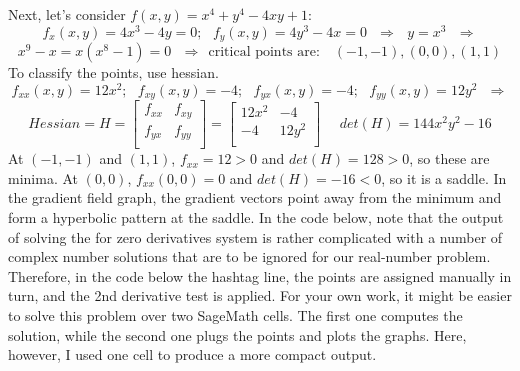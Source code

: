 Next, let's consider $f(x,y) = x^4+y^4-4xy+1$:
$$f_x(x,y) = 4x^3-4y= 0;  \ \ \ f_y(x,y) = 4y^3-4x=0 \ \ \ \Rightarrow \ \ \ y=x^3  \ \ \ \Rightarrow$$
$$ x^9-x=x(x^8-1)=0 \ \ \ \Rightarrow \ \ \text{critical points are: } \ \ \ ( -1,-1), (0,0), (1,1)$$
To classify the points, use hessian.
$$f_{xx}(x,y) =12x^2;  \ \ \ f_{xy}(x,y) = -4; \ \ \  f_{yx}(x,y) = -4;   \ \ \  f_{yy}(x,y) = 12y^2 \ \ \ \Rightarrow$$
$$Hessian= H =  \begin{bmatrix}
     f_{xx} & f_{xy} \\
   f_{yx} & f_{yy} \\
  \end{bmatrix} = \begin{bmatrix}
     12x^2 & -4 \\
   -4 & 12y^2 \\
  \end{bmatrix}  \ \ \ \ \ \ det(H) = 144x^2y^2-16$$
At $(-1,-1)$ and $(1,1)$,  $f_{xx} = 12 > 0$ and $det(H) = 128>0$, so these are minima.
At $(0,0)$,  $f_{xx}( 0,0) =  0$ and $det(H) = -16<0$, so it is a saddle.
In the gradient field graph, the gradient vectors point away from the minimum and form a hyperbolic pattern at the saddle.
In the code below, note that the output of solving the for zero derivatives system is rather complicated with a number of complex number solutions that are to be ignored for our real-number problem.   Therefore, in the code below the hashtag line, the points are assigned manually in turn, and the 2nd derivative test is applied.  For your own work, it might be easier to solve this problem over two SageMath cells. The first one computes the solution, while the second one plugs the points and plots the graphs.  Here, however, I used one cell to produce a more compact output.

